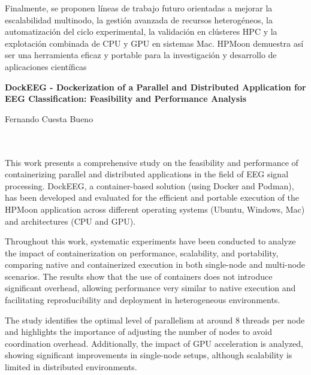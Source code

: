 Finalmente, se proponen líneas de trabajo futuro orientadas a mejorar la escalabilidad multinodo, la gestión avanzada de recursos heterogéneos, la automatización del ciclo experimental, la validación en clústeres HPC y la explotación combinada de CPU y GPU en sistemas Mac. HPMoon demuestra así ser una herramienta eficaz y portable para la investigación y desarrollo de aplicaciones científicas

\cleardoublepage


\thispagestyle{empty}


\begin{center}
       {\large\bfseries DockEEG - Dockerization of a Parallel and Distributed Application for EEG Classification: Feasibility and Performance Analysis}\\
\end{center}
\begin{center}
       Fernando Cuesta Bueno\\
\end{center}

\\

\vspace{0.7cm}
\\

This work presents a comprehensive study on the feasibility and performance of containerizing parallel and distributed applications in the field of EEG signal processing. DockEEG, a container-based solution (using Docker and Podman), has been developed and evaluated for the efficient and portable execution of the HPMoon application across different operating systems (Ubuntu, Windows, Mac) and architectures (CPU and GPU).

Throughout this work, systematic experiments have been conducted to analyze the impact of containerization on performance, scalability, and portability, comparing native and containerized execution in both single-node and multi-node scenarios. The results show that the use of containers does not introduce significant overhead, allowing performance very similar to native execution and facilitating reproducibility and deployment in heterogeneous environments.

The study identifies the optimal level of parallelism at around 8 threads per node and highlights the importance of adjusting the number of nodes to avoid coordination overhead. Additionally, the impact of GPU acceleration is analyzed, showing significant improvements in single-node setups, although scalability is limited in distributed environments.

